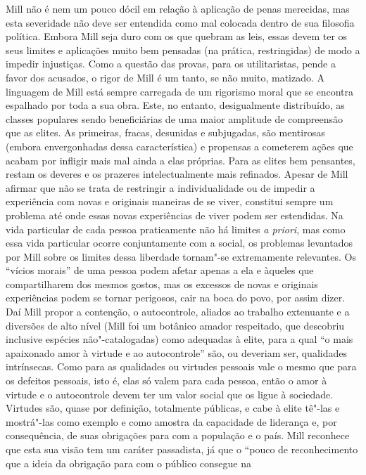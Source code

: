 Mill não é nem um pouco dócil em relação à aplicação de penas merecidas,
mas esta severidade não deve ser entendida como mal colocada dentro de
sua filosofia política. Embora Mill seja duro com os que quebram as
leis, essas devem ter os seus limites e aplicações muito bem pensadas
(na prática, restringidas) de modo a impedir injustiças. Como a questão
das provas, para os utilitaristas, pende a favor dos acusados, o rigor
de Mill é um tanto, se não muito, matizado. A linguagem de Mill está
sempre carregada de um rigorismo moral que se encontra espalhado por
toda a sua obra. Este, no entanto, desigualmente distribuído, as
classes populares sendo beneficiárias de uma maior amplitude de
compreensão que as elites. As primeiras, fracas, desunidas e
subjugadas, são mentirosas (embora envergonhadas dessa característica)
e propensas a cometerem ações que acabam por infligir mais mal ainda a
elas próprias. Para as elites bem pensantes, restam os deveres e os
prazeres intelectualmente mais refinados. Apesar de Mill afirmar
que não se trata de restringir a individualidade ou de impedir
a experiência com novas e originais maneiras de se viver, constitui
sempre um problema até onde essas novas experiências de viver podem ser
estendidas. Na vida particular de cada pessoa praticamente não há
limites \textit{a priori}, mas como essa vida particular ocorre
conjuntamente com a social, os problemas levantados por Mill sobre os
limites dessa liberdade tornam"-se extremamente relevantes. Os ``vícios
morais'' de uma pessoa podem afetar apenas a ela e àqueles que
compartilharem dos mesmos gostos, mas os excessos de novas e originais
experiências podem se tornar perigosos, cair na boca do povo, por assim
dizer. Daí Mill propor a contenção, o autocontrole, aliados ao
trabalho extenuante e a diversões de alto nível (Mill foi um botânico
amador respeitado, que descobriu inclusive espécies não"-catalogadas) 
como adequadas à elite, para a qual ``o mais apaixonado
amor à virtude e ao autocontrole'' são, ou deveriam ser, qualidades
intrínsecas. Como para as qualidades ou virtudes pessoais vale o mesmo
que para os defeitos pessoais, isto é, elas só valem para cada pessoa,
então o amor à virtude e o autocontrole devem ter um valor social que
os ligue à sociedade. Virtudes são, quase por definição, totalmente
públicas, e cabe à elite tê"-las e mostrá"-las como exemplo e como
amostra da capacidade de liderança e, por consequência, de suas
obrigações para com a população e o país. Mill reconhece que esta sua
visão tem um caráter passadista, já que o ``pouco de
reconhecimento que a ideia da obrigação para com o público consegue na
